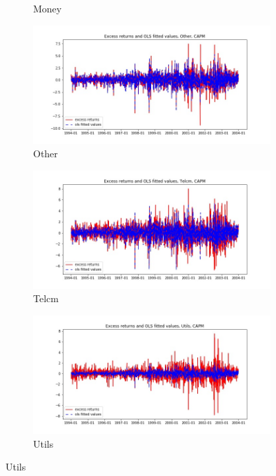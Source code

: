 \documentclass{article}
\begin{document}
\begin{figure}
\begin{subfigure}[b]{0.5\textwidth}
    \caption{Money}
    \label{fig:2}
  \end{subfigure}
  \begin{subfigure}[b]{0.5\textwidth}
    \centering
    \includegraphics[width=\textwidth]{Other/fitted_CAPM.jpg}
    \caption{Other}
    \label{fig:2}
  \end{subfigure}
  \begin{subfigure}[b]{0.5\textwidth}
    \centering
    \includegraphics[width=\textwidth]{Telcm/fitted_CAPM.jpg}
    \caption{Telcm}
    \label{fig:2}
  \end{subfigure}
  \begin{subfigure}[b]{0.5\textwidth}
    \centering
    \includegraphics[width=\textwidth]{Utils/fitted_CAPM.jpg}
    \caption{Utils}
    \label{fig:2}
  \end{subfigure}
\end{figure}
\end{document}
